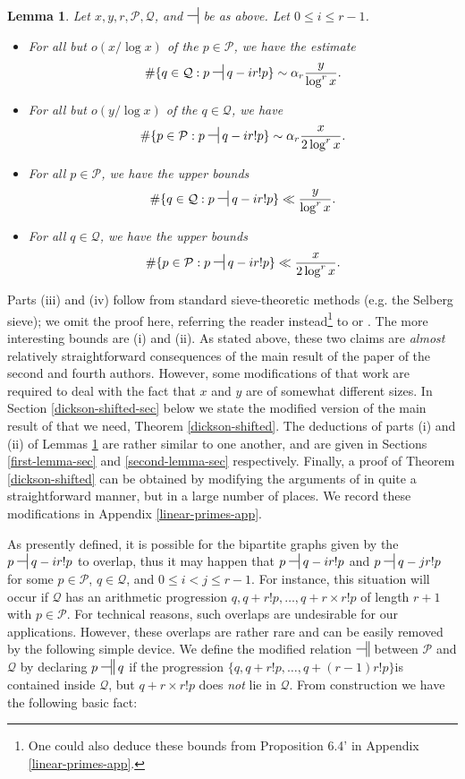 \documentclass[11pt]{amsart}
\numberwithin{equation}{section}  %
\theoremstyle{remark}
\theoremstyle{plain}
\newtheorem{lem}{Lemma}[section]
\numberwithin{equation}{section}
\renewcommand{\leq}{\leqslant}
\renewcommand{\(}{\left(}
\renewcommand{\)}{\right)}
\newcommand{\asym}{\sim}   %
\newcommand{\rel}{\nsststile{}{}}  %
\newcommand{\relr}{\nsdtstile{}{}} %
\newcommand{\PP}{\mathcal{P}}
\newcommand{\QQ}{\mathcal{Q}}
\begin{document}
\begin{lem}\label{first}  Let $x,y,r,\PP,\QQ$, and $\rel$ be as above.   Let $0 \leq i \leq r-1$.
\begin{itemize}
\item[(i)] For all but $o(x/\log x)$ of the $p \in \PP$, we have the estimate
\[ \# \{ q \in \QQ: p \rel q-ir!p \} \asym  \alpha_r \frac{y}{\log^r x}.\]
\item[(ii)] For all but $o(y/\log x)$ of the $q \in \QQ$, we have
\[ \# \{ p \in \PP : p \rel q-ir!p \} \asym  \alpha_r  \frac{x}{2\log^r x}.\]
\item[(iii)]  For \emph{all} $p \in \PP$, we have the upper bounds
\[ \# \{ q \in \QQ: p \rel q-ir!p \} \ll \frac{y}{\log^r x}.\]
\item[(iv)]  For \emph{all} $q \in \QQ$, we have the upper bounds
\[ \# \{ p \in \PP : p \rel q-ir!p \} \ll \frac{x}{2\log^r x}.\]
\end{itemize}
\end{lem}

Parts (iii) and (iv) follow from standard sieve-theoretic methods (e.g. the Selberg sieve); we omit the proof here, referring the reader instead\footnote{One could also deduce these bounds from Proposition 6.4' in Appendix \ref{linear-primes-app}.} to \cite{HR} or \cite{FI}.  The more interesting bounds are (i) and (ii).
As stated above, these two claims are \emph{almost} relatively straightforward consequences of the main result of the paper \cite{gt-linearprimes} of the second and fourth authors. However, some modifications of that work are required to deal with the fact that $x$ and $y$ are of somewhat different sizes. In Section \ref{dickson-shifted-sec} below we state the modified version of the main result of \cite{gt-linearprimes} that we need, Theorem \ref{dickson-shifted}. The deductions of parts (i) and (ii) of Lemmas \ref{first} are
 rather similar to one another, and are given in Sections \ref{first-lemma-sec} and \ref{second-lemma-sec} respectively. Finally, a proof of Theorem \ref{dickson-shifted} can be obtained by modifying the arguments of \cite{gt-linearprimes} in quite a straightforward manner, but in a large number of places. We record these modifications in Appendix  \ref{linear-primes-app}.

As presently defined, it is possible for the bipartite graphs given by the $p \rel q-ir!p$ to overlap, thus it may happen that $p \rel q-ir!p$ and $p \rel q-jr!p$ for some $p \in \PP$, $q \in \QQ$, and $0 \leq i < j \leq r-1$.  For instance, this situation will occur if $\QQ$ has an arithmetic progression $q,q+r!p,\dots,q+r \times r!p$ of length $r+1$ with $p \in \PP$.  For technical reasons, such overlaps are undesirable for our applications.  However, these overlaps are rather rare and can be easily removed by the following simple device.  We define the modified relation $\relr$ between $\PP$ and $\QQ$ by declaring $p \relr q$ if the progression $\{q, q+r!p,\dots,q+(r-1)r!p\}$is contained inside $\QQ$, but $q+r \times r! p$ does \emph{not} lie in $\QQ$.  From construction we have the following basic fact:
\end{document}
